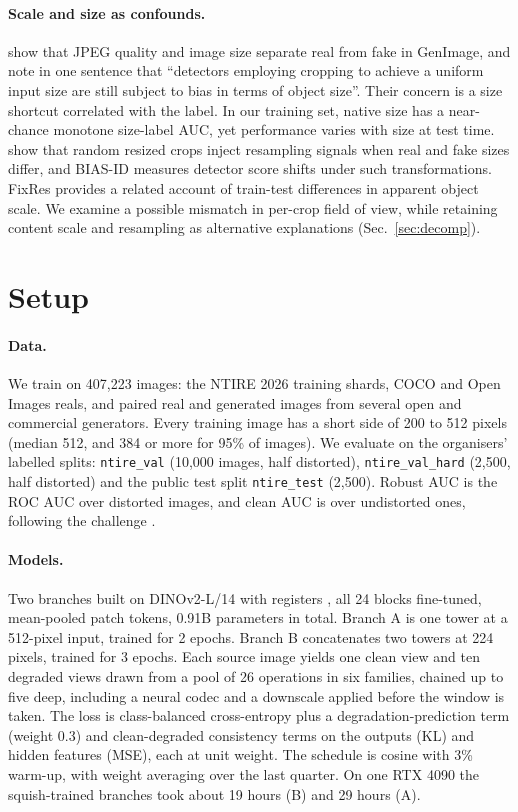 \documentclass[letterpaper]{article} %
\begin{document}
\paragraph{Scale and size as confounds.} \citet{grommelt2024fakeorjpeg}
show that JPEG quality and image size
separate real from fake in GenImage, and note in one sentence that
``detectors employing cropping to achieve a uniform input size are still
subject to bias in terms of object size''. Their concern is a size shortcut
correlated with the label. In our training set, native size has a near-chance
monotone size-label AUC, yet performance varies with size at test time. \citet{rajan2025aligned}
show that random resized crops inject
resampling signals when real and fake sizes differ, and BIAS-ID \cite{ricker2026biasid}
measures detector score shifts under such transformations. FixRes \cite{touvron2019fixres}
provides a related account of train-test differences in apparent object
scale. We examine a possible mismatch in per-crop field of view, while
retaining content scale and resampling as alternative explanations
(Sec.~\ref{sec:decomp}).

\section{Setup}
\label{sec:setup}

\paragraph{Data.} We train on 407,223 images: the NTIRE 2026 training shards,
COCO and Open Images reals, and paired real and generated images from several
open and commercial generators. Every training image has a short side of 200 to
512 pixels (median 512, and 384 or more for 95\% of images). We evaluate on the organisers' labelled splits:
\texttt{ntire\_val} (10,000 images, half distorted), \texttt{ntire\_val\_hard}
(2,500, half distorted) and the public test split \texttt{ntire\_test}
(2,500). Robust AUC is the ROC AUC over distorted images, and clean AUC is
over undistorted ones, following the challenge \cite{gushchin2026ntire}.

\paragraph{Models.} Two branches built on DINOv2-L/14 with
registers \cite{oquab2024dinov2,darcet2024registers}, all 24 blocks
fine-tuned, mean-pooled patch tokens, 0.91B parameters in total. Branch A is
one tower at a 512-pixel input, trained for 2 epochs. Branch B concatenates
two towers at 224 pixels, trained for 3 epochs. Each source image yields one
clean view and ten degraded views drawn from a pool of 26 operations in six
families, chained up to five deep, including a neural codec \cite{balle2018hyperprior}
and a downscale applied before the window is taken. The loss is
class-balanced cross-entropy plus a degradation-prediction term (weight 0.3)
and clean-degraded consistency terms on the outputs (KL) and hidden
features (MSE), each at unit weight. The schedule is cosine with 3\% warm-up, with weight
averaging \cite{izmailov2018swa} over the last quarter. On one RTX 4090 the
squish-trained branches took about 19 hours (B) and 29 hours (A).
\end{document}
